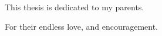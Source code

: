 \mbox{}\\\mbox{}\\\mbox{}\\\mbox{}\\\mbox{}\\ %
\begin{center}
This thesis is dedicated to my parents. 

For their endless love, and encouragement.
\end{center}
